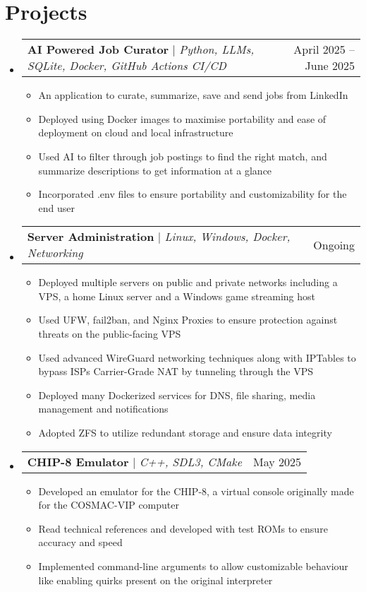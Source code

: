 \documentclass[letterpaper,11pt]{article}
\makeatletter
\newcommand{\resumeItem}[1]{
  \item\small{
    {#1 \vspace{-2pt}}
  }
}
\newcommand{\resumeProjectHeading}[2]{
    \item
    \begin{tabular*}{0.97\textwidth}{l@{\extracolsep{\fill}}r}
      \small#1 & #2 \\
    \end{tabular*}\vspace{-7pt}
}
\newcommand{\resumeSubHeadingListStart}{\begin{itemize}[leftmargin=0.15in, label={}]}
\newcommand{\resumeSubHeadingListEnd}{\end{itemize}}
\newcommand{\resumeItemListStart}{\begin{itemize}}
\newcommand{\resumeItemListEnd}{\end{itemize}\vspace{-5pt}}
\makeatother
\begin{document}
\section{Projects}
    \resumeSubHeadingListStart
      \resumeProjectHeading
          {\textbf{AI Powered Job Curator} $|$ \emph{Python, LLMs, SQLite, Docker, GitHub Actions CI/CD}}{April 2025 -- June 2025}
          \resumeItemListStart
            \resumeItem{An application to curate, summarize, save and send jobs from LinkedIn}
            \resumeItem{Deployed using Docker images to maximise portability and ease of deployment on cloud and local infrastructure}
            \resumeItem{Used AI to filter through job postings to find the right match, and summarize descriptions to get information at a glance}
            \resumeItem{Incorporated .env files to ensure portability and customizability for the end user}
          \resumeItemListEnd
      \resumeProjectHeading
          {\textbf{Server Administration} $|$ \emph{Linux, Windows, Docker, Networking}}{Ongoing}
          \resumeItemListStart
            \resumeItem{Deployed multiple servers on public and private networks including a VPS, a home Linux server and a Windows game streaming host}
            \resumeItem{Used UFW, fail2ban, and Nginx Proxies to ensure protection against threats on the public-facing VPS}
            \resumeItem{Used advanced WireGuard networking techniques along with IPTables to bypass ISPs Carrier-Grade NAT by tunneling through the VPS}
            \resumeItem{Deployed many Dockerized services for DNS, file sharing, media management and notifications}
            \resumeItem{Adopted ZFS to utilize redundant storage and ensure data integrity}
          \resumeItemListEnd
      \resumeProjectHeading
          {\textbf{CHIP-8 Emulator} $|$ \emph{C++, SDL3, CMake}}{May 2025}
          \resumeItemListStart
            \resumeItem{Developed an emulator for the CHIP-8, a virtual console originally made for the COSMAC-VIP computer}
            \resumeItem{Read technical references and developed with test ROMs to ensure accuracy and speed}
            \resumeItem{Implemented command-line arguments to allow customizable behaviour like enabling quirks present on the original interpreter}
          \resumeItemListEnd
    \resumeSubHeadingListEnd
\end{document}
